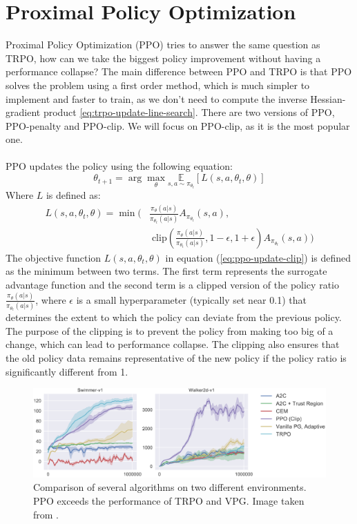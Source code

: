 \section{Proximal Policy Optimization}
Proximal Policy Optimization (PPO) \cite{schulman2017proximal} tries to answer the same question as TRPO, how can we take the biggest policy improvement without having a performance collapse? The main difference between PPO and TRPO is that PPO solves the problem using a first order method, which is much simpler to implement and faster to train, as we don't need to compute the inverse Hessian-gradient product \eqref{eq:trpo-update-line-search}. There are two versions of PPO, PPO-penalty and PPO-clip. We will focus on PPO-clip, as it is the most popular one.\\\\

PPO updates the policy using the following equation:
\begin{equation}
    \theta_{t+1} = \arg\max_{\theta} \underset{s, a \sim \pi_{\theta_t}}{\mathbb{E}} \left[ L(s, a, \theta_t, \theta) \right]
    \label{eq:ppo-update}
\end{equation}
Where $L$ is defined as:
\begin{equation}
    \begin{split}
        L(s, a, \theta_t, \theta) = \min \bigg(& \frac{\pi_{\theta}(a|s)}{\pi_{\theta_t}(a|s)} A_{\pi_{\theta_t}}(s, a),\\
        & \; \text{clip}(\frac{\pi_{\theta}(a|s)}{\pi_{\theta_t}(a|s)}, 1 - \epsilon, 1 + \epsilon) A_{\pi_{\theta_t}}(s, a)\bigg)
    \end{split}
    \label{eq:ppo-update-clip}
\end{equation}
The objective function $L(s, a, \theta_t, \theta)$ in equation (\ref{eq:ppo-update-clip}) is defined as the minimum between two terms. The first term represents the surrogate advantage function and the second term is a clipped version of the policy ratio $\frac{\pi_{\theta}(a|s)}{\pi_{\theta_t}(a|s)}$, where $\epsilon$ is a small hyperparameter (typically set near 0.1) that determines the extent to which the policy can deviate from the previous policy. The purpose of the clipping is to prevent the policy from making too big of a change, which can lead to performance collapse. The clipping also ensures that the old policy data remains representative of the new policy if the policy ratio is significantly different from 1.
\begin{figure}[H]
    \centering
    \includegraphics[width=\textwidth]{images/ppo-comparison.png}
    \caption{Comparison of several algorithms on two different environments. PPO exceeds the performance of TRPO and VPG. Image taken from \cite{schulman2017proximal}.}
    \label{fig:ppo-comparison}
\end{figure}

